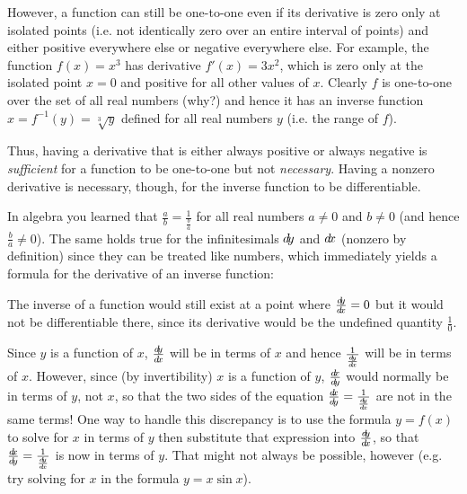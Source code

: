 However, a function can still be one-to-one even if
its derivative is zero only at isolated points (i.e. not identically zero over
an entire interval of points) and either positive everywhere else or negative
everywhere else. For example, the function $f(x) = x^3$ has derivative
$f'(x) = 3x^2$, which is zero only at the isolated point $x = 0$ and positive
for all other values of $x$. Clearly $f$ is one-to-one over the set of all real
numbers (why?) and hence it has an inverse function $x = f^{-1}(y) = \sqrt[3]{y}$
defined for all real numbers $y$ (i.e. the range of $f$).

Thus, having a derivative that is either
always positive or always negative is \emph{sufficient} for a function to be
one-to-one but not \emph{necessary}. Having a nonzero derivative is necessary,
though, for the inverse function to be differentiable.

In algebra you learned that $\frac{a}{b} = \frac{1}{\frac{b}{a}}$ for all real
numbers $a \ne 0$ and $b \ne 0$ (and hence $\frac{b}{a} \ne 0$). The same holds
true for the infinitesimals $d\!y$ and $d\!x$ (nonzero by definition) since they
can be treated like numbers, which immediately yields a formula for the
derivative of an inverse function:

The inverse of a function would still exist at a point where $\frac{d\negmedspace y}{d\!x} = 0$
but it would not be differentiable there, since its derivative would be the
undefined quantity $\frac{1}{0}$.

Since $y$ is a function of $x$, $\frac{d\negmedspace y}{d\!x}$ will be in terms of $x$ and hence
$\frac{1}{\frac{d\negmedspace y}{d\!x}}$ will be in terms of $x$. However, since (by invertibility)
$x$ is a function of $y$, $\frac{d\negmedspace x}{d\!y}$ would normally be in terms of $y$, not $x$,
so that the two sides of the equation $\frac{d\negmedspace x}{d\!y} = \frac{1}{\frac{d\negmedspace y}{d\!x}}$ are not in the
same terms!
One way to handle this discrepancy is to use the formula $y = f(x)$ to solve for
$x$ in terms of $y$ then substitute that expression into $\frac{d\negmedspace y}{d\!x}$, so that
$\frac{d\negmedspace x}{d\!y} = \frac{1}{\frac{d\negmedspace y}{d\!x}}$ is now in terms of $y$. That might not always be
possible, however (e.g. try solving for $x$ in the formula $y = x \sin x$).

